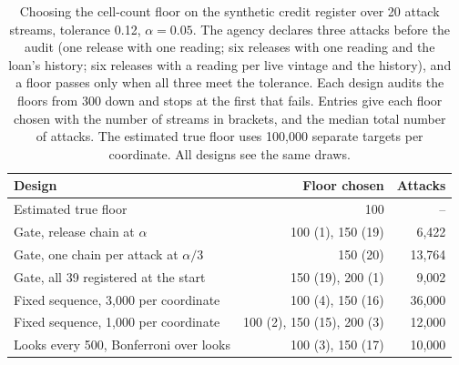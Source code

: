 \begin{table}[t]
\centering
\caption{Choosing the cell-count floor on the synthetic credit register over 20 attack streams, tolerance 0.12, $\alpha=0.05$. The agency declares three attacks before the audit (one release with one reading; six releases with one reading and the loan's history; six releases with a reading per live vintage and the history), and a floor passes only when all three meet the tolerance. Each design audits the floors from 300 down and stops at the first that fails. Entries give each floor chosen with the number of streams in brackets, and the median total number of attacks. The estimated true floor uses 100{,}000 separate targets per coordinate. All designs see the same draws.}
\label{tab:chain-audit}
\small
\begin{tabular}{lrr}
\toprule
Design & Floor chosen & Attacks \\
\midrule
Estimated true floor & 100 & -- \\
\midrule
Gate, release chain at $\alpha$ & 100 (1), 150 (19) & 6{,}422 \\
Gate, one chain per attack at $\alpha/3$ & 150 (20) & 13{,}764 \\
Gate, all 39 registered at the start & 150 (19), 200 (1) & 9{,}002 \\
Fixed sequence, 3{,}000 per coordinate & 100 (4), 150 (16) & 36{,}000 \\
Fixed sequence, 1{,}000 per coordinate & 100 (2), 150 (15), 200 (3) & 12{,}000 \\
Looks every 500, Bonferroni over looks & 100 (3), 150 (17) & 10{,}000 \\
\bottomrule
\end{tabular}
\end{table}
